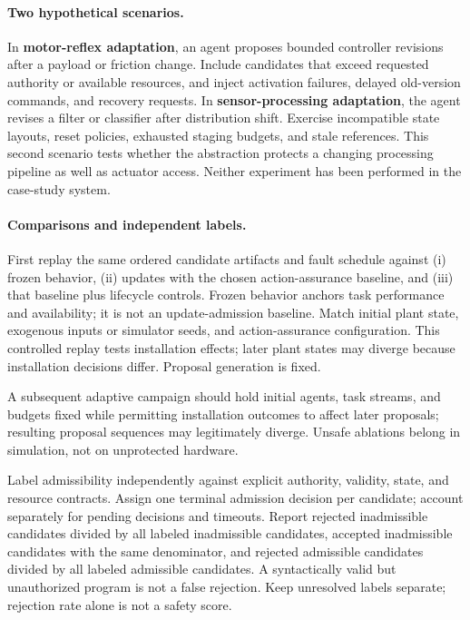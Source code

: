 \documentclass{article}
\begin{document}
\paragraph{Two hypothetical scenarios.}
In \textbf{motor-reflex adaptation}, an agent proposes bounded controller revisions after a payload or friction change. Include candidates that exceed requested authority or available resources, and inject activation failures, delayed old-version commands, and recovery requests. In \textbf{sensor-processing adaptation}, the agent revises a filter or classifier after distribution shift. Exercise incompatible state layouts, reset policies, exhausted staging budgets, and stale references. This second scenario tests whether the abstraction protects a changing processing pipeline as well as actuator access. Neither experiment has been performed in the case-study system.

\paragraph{Comparisons and independent labels.}
First replay the same ordered candidate artifacts and fault schedule against (i) frozen behavior, (ii) updates with the chosen action-assurance baseline, and (iii) that baseline plus lifecycle controls. Frozen behavior anchors task performance and availability; it is not an update-admission baseline. Match initial plant state, exogenous inputs or simulator seeds, and action-assurance configuration. This controlled replay tests installation effects; later plant states may diverge because installation decisions differ. Proposal generation is fixed.

A subsequent adaptive campaign should hold initial agents, task streams, and budgets fixed while permitting installation outcomes to affect later proposals; resulting proposal sequences may legitimately diverge. Unsafe ablations belong in simulation, not on unprotected hardware.

Label admissibility independently against explicit authority, validity, state, and resource contracts. Assign one terminal admission decision per candidate; account separately for pending decisions and timeouts. Report rejected inadmissible candidates divided by all labeled inadmissible candidates, accepted inadmissible candidates with the same denominator, and rejected admissible candidates divided by all labeled admissible candidates. A syntactically valid but unauthorized program is not a false rejection. Keep unresolved labels separate; rejection rate alone is not a safety score.
\end{document}
